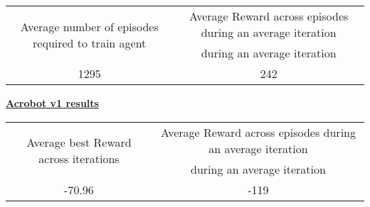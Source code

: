 \documentclass{article}
\begin{document}
    \begin{table}[htbp]
        \centering
        \begin{tabular}{|c|c|}
            \hline
            \multicolumn{1}{|c|}{\multirow{2}{*}{Average number of episodes required to train agent}} & \multicolumn{1}{c|}{Average Reward across episodes during an average iteration} \\
            \multicolumn{1}{|c|}{}                                                                    & \multicolumn{1}{c|}{during an average iteration}                                \\
            \hline
            1295                                                                                      & 242                                                                             \\
            \hline
        \end{tabular}
    \end{table}

    \begin{center}
        \textbf{\underline{ Acrobot v1 results}}
    \end{center}

    \begin{table}[htbp]
        \centering
        \begin{tabular}{|c|c|}
            \hline
            \multicolumn{1}{|c|}{\multirow{2}{*}{Average best Reward
            across iterations}}    & \multicolumn{1}{c|}{Average Reward across episodes during an average iteration} \\
            \multicolumn{1}{|c|}{} & \multicolumn{1}{c|}{during an average iteration}                                \\
            \hline
            -70.96                 & -119                                                                            \\
            \hline
        \end{tabular}
    \end{table}
\end{document}
